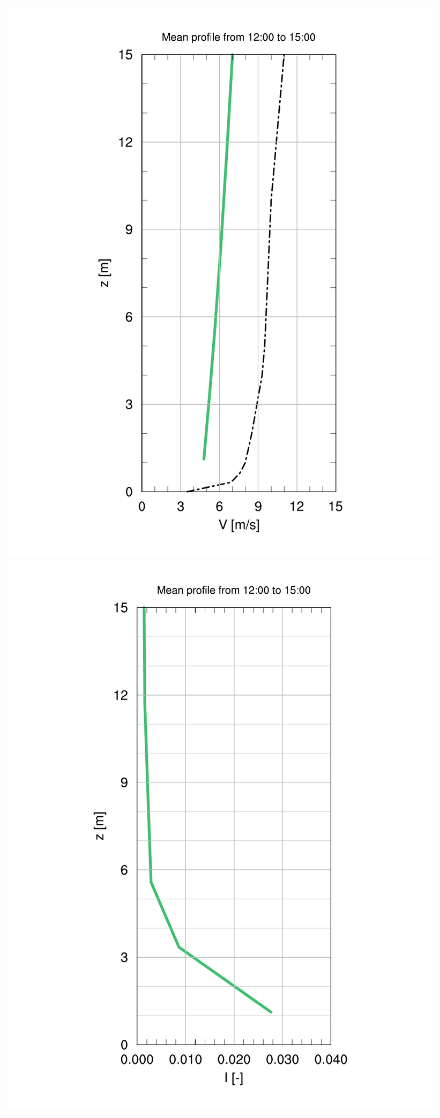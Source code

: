 \begin{figure}[H]
	\begin{minipage}{0.5\linewidth}
	\end{minipage}%
	\begin{minipage}{0.5\linewidth}
	\end{minipage}%
	
	\begin{minipage}{0.5\linewidth}
		\centering
		\includegraphics[width=0.7\linewidth,trim={4.5cm 12mm 4.3cm 20mm},clip]{Imagenes/06/bol/V_referencia}%
	\end{minipage}%
	\begin{minipage}{0.5\linewidth}
		\centering
		\includegraphics[width=0.7\linewidth,trim={4.5cm 12mm 4.3cm 20mm},clip]{Imagenes/06/bol/tke_referencia}%
	\end{minipage}%
	

\end{figure}
